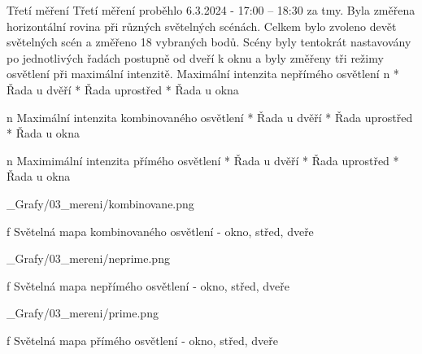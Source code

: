 \sec Třetí měření
Třetí měření proběhlo 6.3.2024 - 17:00 – 18:30 za tmy. Byla změřena horizontální rovina při různých světelných scénách. Celkem bylo zvoleno devět světelných scén a změřeno 18 vybraných bodů. Scény byly tentokrát nastavovány po jednotlivých řadách postupně od dveří k oknu a byly změřeny tři režimy osvětlení při maximální intenzitě.
\medskip
{\sbf Maximální intenzita nepřímého osvětlení}
\medskip
\begitems \style n
    * Řada u dvěří
    \medskip
    * Řada uprostřed
    \medskip
    * Řada u okna
\enditems

\medskip
\begitems \style n
{\sbf Maximální intenzita kombinovaného osvětlení}
\medskip
    * Řada u dvěří
    \medskip
    * Řada uprostřed
    \medskip
    * Řada u okna
\enditems
\medskip

\begitems \style n
{\sbf Maximimální intenzita přímého osvětlení}
\medskip
    * Řada u dvěří
    \medskip
    * Řada uprostřed
    \medskip
    * Řada u okna
\enditems

\medskip {}
\picw=18cm _Grafy/03_mereni/kombinovane.png
\caption/f Světelná mapa kombinovaného osvětlení - okno, střed, dveře
\medskip

\medskip {}
\picw=18cm _Grafy/03_mereni/neprime.png
\caption/f Světelná mapa nepřímého osvětlení - okno, střed, dveře
\medskip

\medskip {}
\picw=18cm _Grafy/03_mereni/prime.png
\caption/f Světelná mapa přímého osvětlení - okno, střed, dveře
\medskip